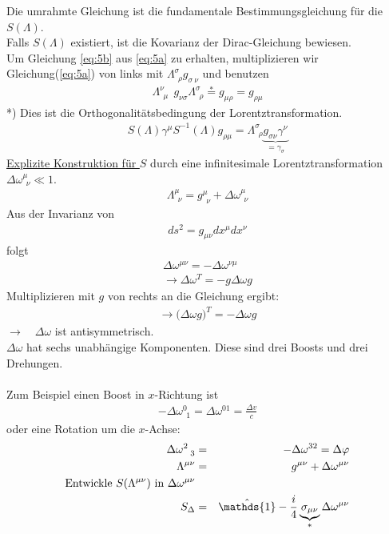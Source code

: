 Die umrahmte Gleichung ist die fundamentale Bestimmungsgleichung für die $S(\Lambda)$.\\
Falls $S(\Lambda)$ existiert, ist die Kovarianz der Dirac-Gleichung bewiesen.\\
Um Gleichung \ref{eq:5b} aus \ref{eq:5a} zu erhalten, multiplizieren wir Gleichung(\ref{eq:5a}) von links mit $\Lambda^{\sigma}_{\ \ \rho}g_{\sigma \ \nu}$ und benutzen
\begin{eqnarray*}
 \Lambda_{\ \ \mu}^{\nu} \ \  g_{\nu \sigma} \Lambda_{\ \ \rho}^{\sigma} \overset * = g_{\mu \rho} = g_{\rho \mu}
\end{eqnarray*}
*) Dies ist die Orthogonalitätsbedingung der Lorentztransformation.
\begin{eqnarray*}
S(\Lambda)\gamma^{\mu}S^{-1}(\Lambda) g_{\rho\mu} = \Lambda^{\sigma}_{\ \ \rho} \underbrace{g_{\sigma\nu}\gamma^{\nu}}_{= \gamma_{\sigma}}
\end{eqnarray*}
\underline{Explizite Konstruktion für $S$}
durch eine infinitesimale Lorentztransformation $\Delta\omega_{\;\,\nu}^{\mu}\ll 1$. 
\begin{eqnarray*} \Lambda_{\ \ \nu}^{\mu} = g_{\ \ \nu}^{\mu} + \Delta\omega_{\ \ \nu}^{\mu} \end{eqnarray*}
Aus der Invarianz von
\begin{eqnarray*} ds ^2 = g_{\mu\nu}dx^{\mu}dx^{\nu}\end{eqnarray*}
folgt
\begin{eqnarray*}
\boxed{\Delta \omega^{\mu\nu} = -\Delta \omega^{\nu\mu}}\\
\rightarrow \Delta \omega^T = - g\Delta\omega g\end{eqnarray*}
Multiplizieren mit $g$ von rechts an die Gleichung ergibt:
\begin{eqnarray*}
\rightarrow \big (\Delta\omega g \big)^T = -\Delta \omega g
\end{eqnarray*}
$\rightarrow \quad \Delta \omega$  ist antisymmetrisch.\\
$\Delta \omega$ hat sechs unabhängige Komponenten. Diese sind drei Boosts und drei Drehungen.\\
\\
Zum Beispiel einen Boost in $x$-Richtung ist
\begin{eqnarray*} 
	-\Delta \omega^{0}_{\;\,1}=\Delta \omega^{01} = \frac{\Delta v}{c}
\end{eqnarray*}
oder eine Rotation um die $x$-Achse:
\begin{eqnarray*} \Delta \omega^2 _{ \ \ 3} \g - \Delta \omega^{3 2} = \Delta \varphi \\
\Lambda^{\mu\nu} \g g^{\mu\nu} + \Delta\omega^{\mu\nu}\\
\text{Entwickle } S(\Lambda^{\mu\nu}) \text{  in  }\Delta\omega^{\mu\nu}&{}&\\
S_{\Delta} \g \hat{\mathds {1}} - \frac i 4 \underbrace{\sigma_{\mu\nu}}_{*} \Delta \omega^{\mu\nu}
\end{eqnarray*}
